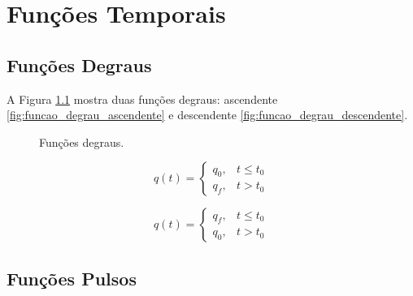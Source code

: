 \chapter{Funções Temporais} \label{app:funcoes}

    \section{Funções Degraus} \label{sec:funcoes_degraus}
    
        A Figura \ref{fig:funcoes_degraus} mostra duas funções degraus: ascendente \ref{fig:funcao_degrau_ascendente} e descendente \ref{fig:funcao_degrau_descendente}.
    
        \begin{figure}[htb]
            \centering
            \caption{Funções degraus.} \label{fig:funcoes_degraus}
        \end{figure}
        
        \begin{equation} \label{eq:funcao_degrau_ascendente}
            q(t) =
            \begin{cases}
                q_0 ,& t \leq t_0 \\
                q_f ,& t > t_0
            \end{cases}
        \end{equation}
        
        \begin{equation} \label{eq:funcao_degrau_descendente}
            q(t) =
            \begin{cases}
                q_f ,& t \leq t_0 \\
                q_0 ,& t > t_0
            \end{cases}
        \end{equation}
    
    \section{Funções Pulsos} \label{sec:funcoes_pulsos}
    
